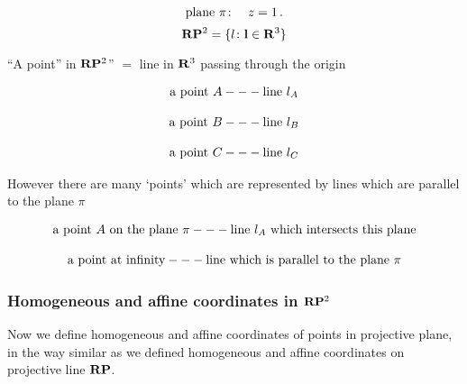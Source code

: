 \documentclass[12pt]{article}
\numberwithin{equation}{section}
\begin{document}
\begin{equation*}
\hbox {plane}\,\, \pi\colon\quad z=1\,.
\end{equation*}
         \begin{equation*}
{\bf R}{\bf P}^2=\{l\colon {\bf l}\in{\bf R}^3\}
         \end{equation*}


        \centerline
     {
``A point'' in ${\bf R}{\bf P}^2$''  $=$ line in ${\bf R}^3$
  passing through  the origin
          }


\begin {equation*}
\begin{matrix}
\hbox{a point}\,\, A--- \hbox{line}\,\, l_{A}\cr
             \cr
\hbox{a point}\,\, B--- \hbox{line}\,\, l_{B}\cr
\cr
\hbox{a point}\,\, C--- \hbox{line}\,\, l_{C}\cr   
 \end{matrix}
\end {equation*}

However there are many `points' which are represented
by lines which are parallel to the plane $\pi$

    \begin {equation*}
\begin{matrix}
\hbox{a point $A$ on the plane $\pi$}--- \hbox{line $l_{A}$ 
                          which intersects this
             plane}\cr
             \cr
\hbox {a point at infinity}---   \hbox {line which is parallel to
                                       the plane $\pi$}\cr
 \end{matrix}
\end {equation*}

 
    \subsubsection {Homogeneous and affine coordinates in ${\bf R}{\bf P}^2$}
Now we define homogeneous and affine coordinates of points
in projective plane, in the way similar as
we defined homogeneous and affine coordinates on projective line 
${\bf R}{\bf P}$.
\end{document}
